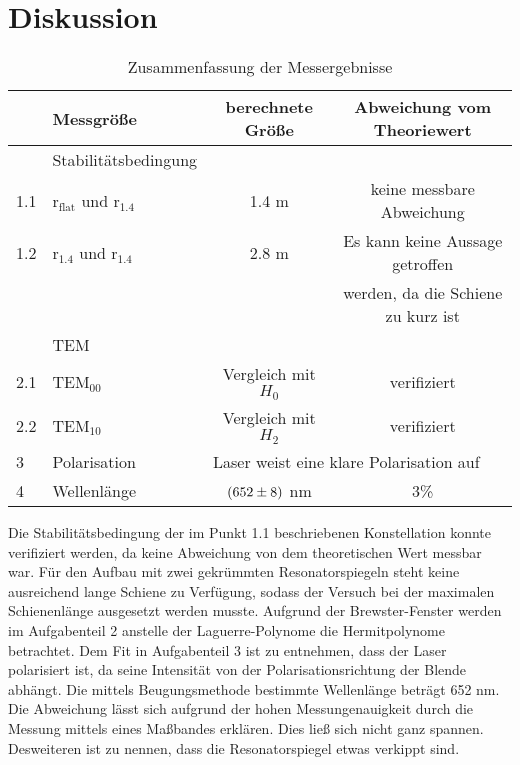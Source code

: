 \section{Diskussion}
\label{sec:Diskussion}

\begin{table}
  \centering
  \begin{tabular}{l|l | c c}
    \toprule
	&Messgröße	& berechnete Größe	& Abweichung vom Theoriewert \\
    \midrule
	& Stabilitätsbedingung \\
	1.1& \rightarrow $\text{r}_\text{flat}$ und $\text{r}_\text{1.4}$ & 1.4 m & keine messbare Abweichung \\
	1.2& \rightarrow $\text{r}_\text{1.4}$ und $\text{r}_\text{1.4}$ & 2.8 m& Es kann keine Aussage getroffen \\
	& & &werden, da die Schiene zu kurz ist \\
	& TEM\\
	2.1& \rightarrow TEM$_{00}$ & Vergleich mit $H_0$ & verifiziert \\
	2.2& \rightarrow TEM$_{10}$ & Vergleich mit $H_2$ & verifiziert \\
	3& Polarisation& \multicolumn{2}{l}{Laser weist eine klare Polarisation auf} \\
	4& Wellenlänge & $(\num{652 +-8})$ nm & 3\% \\
    \bottomrule
  \end{tabular}
  \caption{Zusammenfassung der Messergebnisse}
  \label{tab:Mess}
\end{table}

Die Stabilitätsbedingung der im Punkt 1.1 beschriebenen Konstellation konnte verifiziert werden, da keine Abweichung von dem theoretischen Wert messbar war. Für den Aufbau mit zwei gekrümmten Resonatorspiegeln steht keine ausreichend lange Schiene zu Verfügung, sodass der Versuch bei der maximalen Schienenlänge ausgesetzt werden musste. Aufgrund der Brewster-Fenster werden im Aufgabenteil 2 anstelle der Laguerre-Polynome die Hermitpolynome betrachtet. Dem Fit in Aufgabenteil 3 ist zu entnehmen, dass der Laser polarisiert ist, da seine Intensität von der Polarisationsrichtung der Blende abhängt. Die mittels Beugungsmethode bestimmte Wellenlänge beträgt 652 nm. Die Abweichung lässt sich aufgrund der hohen Messungenauigkeit durch die Messung mittels eines Maßbandes erklären. Dies ließ sich nicht ganz spannen. Desweiteren ist zu nennen, dass die Resonatorspiegel etwas verkippt sind.
